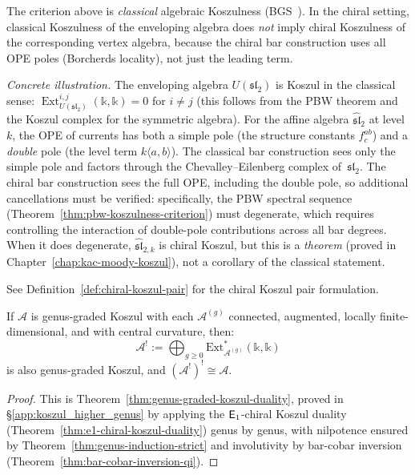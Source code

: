\begin{remark}\label{rem:classical-vs-chiral-koszulness}
The criterion above is \emph{classical} algebraic Koszulness
(BGS~\cite{BGS96}).  In the chiral setting, classical Koszulness of
the enveloping algebra does \emph{not} imply chiral Koszulness of the
corresponding vertex algebra, because the chiral bar construction
uses all OPE poles (Borcherds locality), not just the leading term.

\emph{Concrete illustration.}
The enveloping algebra $U(\mathfrak{sl}_2)$ is Koszul in the classical
sense: $\operatorname{Ext}^{i,j}_{U(\mathfrak{sl}_2)}(\mathbb{k},
\mathbb{k}) = 0$ for $i \neq j$ (this follows from the PBW theorem
and the Koszul complex for the symmetric algebra).  For the affine
algebra $\widehat{\mathfrak{sl}}_2$ at level~$k$, the OPE of
currents has both a simple pole (the structure constants $f^{ab}_c$)
and a \emph{double} pole (the level term $k\langle a, b\rangle$).
The classical bar construction sees only the simple pole and factors
through the Chevalley--Eilenberg complex of~$\mathfrak{sl}_2$.  The
chiral bar construction sees the full OPE, including the double pole,
so additional cancellations must be verified: specifically, the PBW
spectral sequence (Theorem~\ref{thm:pbw-koszulness-criterion}) must
degenerate, which requires controlling the interaction of double-pole
contributions across all bar degrees.  When it does degenerate,
$\widehat{\mathfrak{sl}}_{2,k}$ is chiral Koszul, but this is a
\emph{theorem} (proved in Chapter~\ref{chap:kac-moody-koszul}), not a
corollary of the classical statement.

See Definition~\ref{def:chiral-koszul-pair} for the chiral Koszul pair
formulation.
\end{remark}

\begin{theorem}
\label{thm:genus-graded-koszul-duality-appendix}
If $\mathcal{A}$ is genus-graded Koszul with each $\mathcal{A}^{(g)}$ connected, augmented,
locally finite-dimensional, and with central curvature, then:
\[\mathcal{A}^! := \bigoplus_{g \geq 0} \text{Ext}_{\mathcal{A}^{(g)}}^*(\mathbb{k}, \mathbb{k})\]
is also genus-graded Koszul, and $(\mathcal{A}^!)^! \cong \mathcal{A}$.
\end{theorem}

\begin{proof}
This is Theorem~\ref{thm:genus-graded-koszul-duality}, proved in
\S\ref{app:koszul_higher_genus} by applying the $\mathsf{E}_1$-chiral Koszul
duality (Theorem~\ref{thm:e1-chiral-koszul-duality}) genus by genus, with
nilpotence ensured by Theorem~\ref{thm:genus-induction-strict} and
involutivity by bar-cobar inversion
(Theorem~\ref{thm:bar-cobar-inversion-qi}).
\end{proof}


